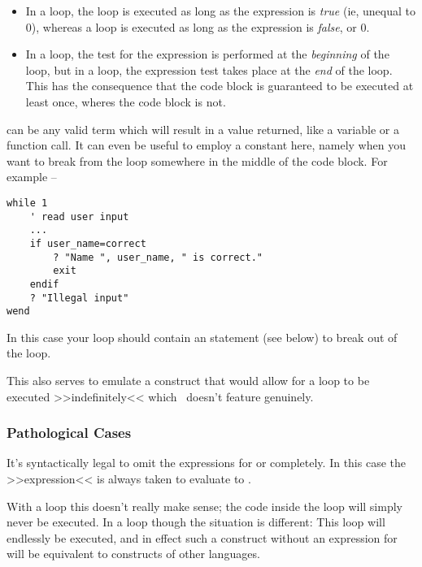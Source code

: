 \begin{itemize}

\item In a  loop, the loop is executed as long as
the expression is \emph{true} (ie, unequal to $0$), whereas a  loop is executed as long as the expression is
\emph{false}, or $0$.

\item In a  loop, the test for the expression is
performed at the \emph{beginning} of the loop, but in a  loop, the expression test takes place at the \emph{end} of the loop.
This has the consequence that the \Co{repeat \ldots} code block is
guaranteed to be executed at least once, wheres the 
code block is not.

\end{itemize}

 can be any valid term which will result in a value
returned, like a variable or a function call. It can even be useful to employ
a constant here, namely when you want to break from the loop somewhere
in the middle of the code block. For example --

\begin{lstlisting}
while 1
	' read user input
	...
	if user_name=correct
		? "Name ", user_name, " is correct."
		exit
	endif
	? "Illegal input"
wend
\end{lstlisting}

In this case your loop should contain an  statement (see below) to
break out of the loop.

This also serves to emulate a  
construct that would allow for a loop to be executed >>indefinitely<<
which \SB\ doesn't feature genuinely.

\subsubsection{Pathological Cases}

It's syntactically legal to omit the expressions for  or
\Co{until} completely. In this case the >>expression<< is always taken
to evaluate to \Co{$0$}.

With a  loop this doesn't really make sense; the
code inside the loop will simply never be executed. In a \Co{repeat
\ldots until} loop though the situation is different: This loop will
endlessly be executed, and in effect such a construct without an
expression for \Co{repeat} will be equivalent to 
constructs of other languages.


